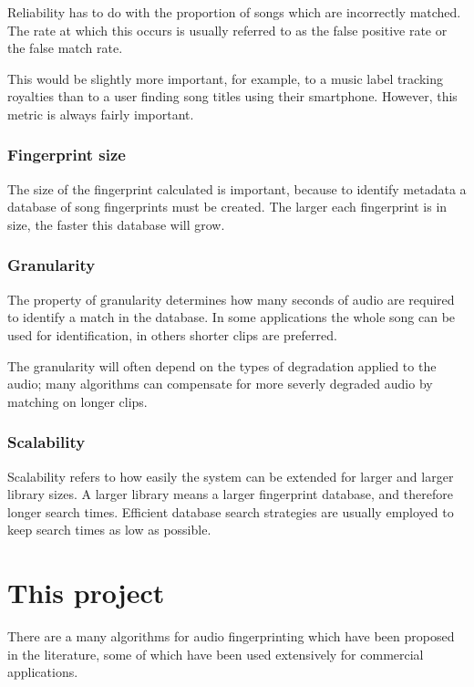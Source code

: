 \documentclass[12pt,a4paper,twoside,openright]{report}
\begin{document}
Reliability has to do with the proportion of songs which are incorrectly matched. The rate at which this occurs is usually referred to as the false positive rate or the false match rate.

This would be slightly more important, for example, to a music label tracking royalties than to a user finding song titles using their smartphone. However, this metric is always fairly important.

\subsubsection{Fingerprint size}

The size of the fingerprint calculated is important, because to identify metadata a database of song fingerprints must be created. The larger each fingerprint is in size, the faster this database will grow.

\subsubsection{Granularity}

The property of granularity determines how many seconds of audio are required to identify a match in the database. In some applications the whole song can be used for identification, in others shorter clips are preferred. 

The granularity will often depend on the types of degradation applied to the audio; many algorithms can compensate for more severly degraded audio by matching on longer clips.

\subsubsection{Scalability}

Scalability refers to how easily the system can be extended for larger and larger library sizes. A larger library means a larger fingerprint database, and therefore longer search times. Efficient database search strategies are usually employed to keep search times as low as possible.


\section{This project}

There are a many algorithms for audio fingerprinting which have been proposed in the literature, some of which have been used extensively for commercial applications. 
\end{document}
